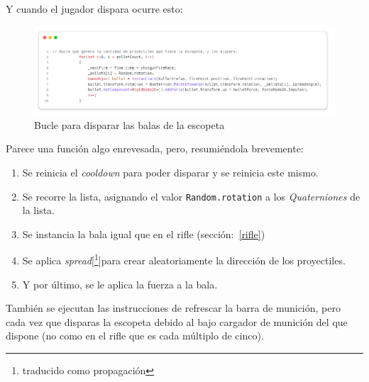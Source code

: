 \documentclass[11pt]{article}
\begin{document}
            Y cuando el jugador dispara ocurre esto:\\
            \begin{figure}[H]
                \centering
                \includegraphics[width=\textwidth]{Images/ShootyMacShooty/shootpelletes.png}
                \caption{Bucle para disparar las balas de la escopeta}
            \end{figure}
            Parece una función algo enrevesada, pero, resumiéndola brevemente:
            \begin{enumerate}
                \item Se reinicia el \textit{cooldown} para poder disparar y se reinicia este mismo.
                \item Se recorre la lista, asignando el valor \texttt{Random.rotation} a los \textit{Quaterniones} de la lista.
                \item Se instancia la bala igual que en el rifle (sección:~\ref{rifle})
                \item Se aplica \textit{spread}[\footnote{traducido como propagación}]para crear aleatoriamente la dirección de los proyectiles. 
                \item Y por último, se le aplica la fuerza a la bala.
            \end{enumerate}
            También se ejecutan las instrucciones de refrescar la barra de munición, pero cada vez que disparas la escopeta debido al bajo cargador de munición del que dispone (no como en el rifle que es cada múltiplo de cinco). \\
            
        \newpage
\end{document}
